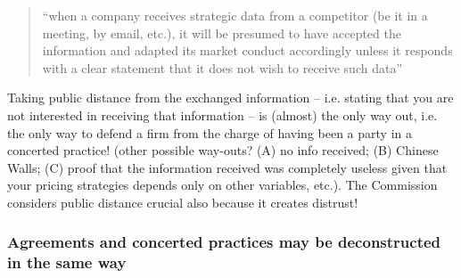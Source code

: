             \begin{quote}
                “when a company receives strategic data from a competitor (be it in a meeting, by email, etc.), it will be presumed to have accepted the information and adapted its market conduct accordingly unless it responds with a clear statement that it does not wish to receive such data”
            \end{quote}


            Taking public distance from the exchanged information – i.e. stating that you are not interested in receiving that information – is (almost) the only way out, i.e. the only way to defend a firm from the charge of having been a party in a concerted practice! (other possible way-outs? (A) no info received; (B) Chinese Walls; (C) proof that the information received was completely useless given that your pricing strategies depends only on other variables, etc.). The Commission considers public distance crucial also because it creates distrust!



        \subsubsection{Agreements and concerted practices may be deconstructed in the same way}

